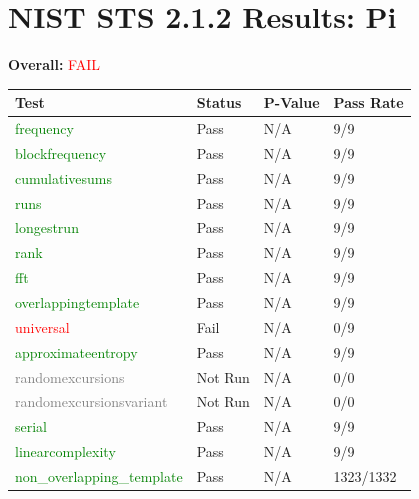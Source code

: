 \documentclass{article}
\begin{document}
\section*{NIST STS 2.1.2 Results: Pi}
\textbf{Overall:} \textcolor{red}{FAIL}

\begin{tabular}{|l|l|l|l|}
\hline
Test & Status & P-Value & Pass Rate \\
\hline
\textcolor{green}{frequency} & Pass & N/A & 9/9 \\
\textcolor{green}{blockfrequency} & Pass & N/A & 9/9 \\
\textcolor{green}{cumulativesums} & Pass & N/A & 9/9 \\
\textcolor{green}{runs} & Pass & N/A & 9/9 \\
\textcolor{green}{longestrun} & Pass & N/A & 9/9 \\
\textcolor{green}{rank} & Pass & N/A & 9/9 \\
\textcolor{green}{fft} & Pass & N/A & 9/9 \\
\textcolor{green}{overlappingtemplate} & Pass & N/A & 9/9 \\
\textcolor{red}{universal} & Fail & N/A & 0/9 \\
\textcolor{green}{approximateentropy} & Pass & N/A & 9/9 \\
\textcolor{gray}{randomexcursions} & Not Run & N/A & 0/0 \\
\textcolor{gray}{randomexcursionsvariant} & Not Run & N/A & 0/0 \\
\textcolor{green}{serial} & Pass & N/A & 9/9 \\
\textcolor{green}{linearcomplexity} & Pass & N/A & 9/9 \\
\textcolor{green}{non_overlapping_template} & Pass & N/A & 1323/1332 \\
\hline
\end{tabular}
\end{document}
